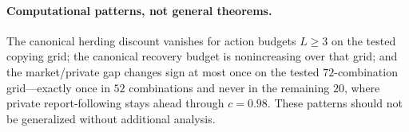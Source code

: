 \documentclass[11pt]{article}
\theoremstyle{definition}
\theoremstyle{remark}
\newcommand{\1}{\mathbf{1}}
\begin{document}
\paragraph{Computational patterns, not general theorems.}
The canonical herding discount vanishes for action budgets $L\ge3$ on the tested copying grid; the canonical recovery budget is nonincreasing over that grid; and the market/private gap changes sign at most once on the tested $72$-combination grid---exactly once in $52$ combinations and never in the remaining $20$, where private report-following stays ahead through $c=0.98$. These patterns should not be generalized without additional analysis.



\end{document}
